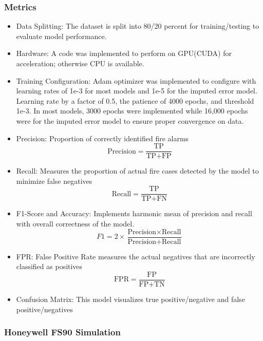 \documentclass[conference]{IEEEtran}
\begin{document}
\subsubsection{Metrics}
\begin{itemize}
\item Data Splitting: The dataset is split into 80/20
percent for training/testing to evaluate model performance. 
\item Hardware: A code was implemented to perform on
GPU(CUDA) for acceleration; otherwise CPU is available. 
\item Training Configuration: Adam optimizer was implemented
to configure with learning rates of 1e-3 for most models and
1e-5 for the imputed error model. Learning rate by a factor
of 0.5, the patience of 4000 epochs, and threshold 1e-3. In
most models, 3000 epochs were implemented while 16,000
epochs were for the imputed error model to ensure proper
convergence on data. 
\item Precision: Proportion of correctly identified fire
alarms 
\begin{equation}
    \text{Precision} = \frac{\text{TP}}{\text{TP} + \text{FP}}
\end{equation}
\item Recall: Measures the proportion of actual fire cases
detected by the model to minimize false negatives
\begin{equation}
    \text{Recall} = \frac{\text{TP}}{\text{TP} + \text{FN}}
\end{equation}
\item F1-Score and Accuracy: Implements harmonic mean of
precision and recall with overall correctness of the model.
\begin{equation}
    F1 = 2 \times \frac{\text{Precision} \times \text{Recall}}{\text{Precision} + \text{Recall}}
\end{equation}
\item FPR: False Positive Rate measures the actual negatives
that are incorrectly classified as positives 
\begin{equation}
    \text{FPR} = \frac{\text{FP}}{\text{FP} + \text{TN}}
\end{equation}
\item Confusion Matrix: This model visualizes true
positive/negative and false positive/negatives
\end{itemize}
\subsubsection{Honeywell FS90 Simulation}
\end{document}
